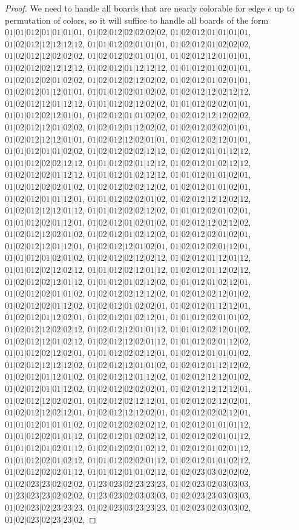 \documentclass[12pt]{article}
\theoremstyle{plain}
\theoremstyle{definition}
\theoremstyle{remark}
\begin{document}
\begin{proof}
	We need to handle all boards that are nearly colorable for edge $e$ up to permutation of colors, so it will suffice to handle all boards of the form $01|01|012|01|01|01|01$, $01|02|012|02|02|02|02$, $01|02|012|01|01|01|01$, $01|02|012|12|12|12|12$, $01|01|012|02|01|01|01$, $01|02|012|01|02|02|02$, $01|02|012|12|02|02|02$, $01|02|012|02|01|01|01$, $01|02|012|12|01|01|01$, $01|02|012|02|12|12|12$, $01|02|012|01|12|12|12$, $01|01|012|01|02|01|01$, $01|02|012|02|01|02|02$, $01|02|012|02|12|02|02$, $01|02|012|01|02|01|01$, $01|02|012|01|12|01|01$, $01|01|012|02|01|02|02$, $01|02|012|12|02|12|12$, $01|02|012|12|01|12|12$, $01|01|012|02|12|02|02$, $01|01|012|02|02|01|01$, $01|01|012|02|12|01|01$, $01|02|012|01|01|02|02$, $01|02|012|12|12|02|02$, $01|02|012|12|01|02|02$, $01|02|012|01|12|02|02$, $01|02|012|02|02|01|01$, $01|02|012|12|12|01|01$, $01|02|012|12|02|01|01$, $01|02|012|02|12|01|01$, $01|01|012|01|01|02|02$, $01|02|012|02|02|12|12$, $01|02|012|01|01|12|12$, $01|01|012|02|02|12|12$, $01|01|012|02|01|12|12$, $01|02|012|01|02|12|12$, $01|02|012|02|01|12|12$, $01|01|012|01|02|12|12$, $01|01|012|01|01|02|01$, $01|02|012|02|02|01|02$, $01|02|012|02|02|12|02$, $01|02|012|01|01|02|01$, $01|02|012|01|01|12|01$, $01|01|012|02|02|01|02$, $01|02|012|12|12|02|12$, $01|02|012|12|12|01|12$, $01|01|012|02|02|12|02$, $01|01|012|02|01|02|01$, $01|01|012|02|01|12|01$, $01|02|012|01|02|01|02$, $01|02|012|12|02|12|02$, $01|02|012|12|02|01|02$, $01|02|012|01|02|12|02$, $01|02|012|02|01|02|01$, $01|02|012|12|01|12|01$, $01|02|012|12|01|02|01$, $01|02|012|02|01|12|01$, $01|01|012|01|02|01|02$, $01|02|012|02|12|02|12$, $01|02|012|01|12|01|12$, $01|01|012|02|12|02|12$, $01|01|012|02|12|01|12$, $01|02|012|01|12|02|12$, $01|02|012|02|12|01|12$, $01|01|012|01|02|12|02$, $01|01|012|01|02|12|01$, $01|02|012|02|01|01|02$, $01|02|012|02|12|12|02$, $01|02|012|02|12|01|02$, $01|02|012|02|01|12|02$, $01|02|012|01|02|02|01$, $01|02|012|01|12|12|01$, $01|02|012|01|12|02|01$, $01|02|012|01|02|12|01$, $01|01|012|02|01|01|02$, $01|02|012|12|02|02|12$, $01|02|012|12|01|01|12$, $01|01|012|02|12|01|02$, $01|02|012|12|01|02|12$, $01|02|012|12|02|01|12$, $01|01|012|02|01|12|02$, $01|01|012|02|12|02|01$, $01|01|012|02|02|12|01$, $01|02|012|01|01|01|02$, $01|02|012|12|12|12|02$, $01|02|012|12|01|01|02$, $01|02|012|01|12|12|02$, $01|02|012|01|12|01|02$, $01|02|012|12|01|12|02$, $01|02|012|12|12|01|02$, $01|02|012|01|01|12|02$, $01|02|012|02|02|02|01$, $01|02|012|12|12|12|01$, $01|02|012|12|02|02|01$, $01|02|012|02|12|12|01$, $01|02|012|02|12|02|01$, $01|02|012|12|02|12|01$, $01|02|012|12|12|02|01$, $01|02|012|02|02|12|01$, $01|01|012|01|01|01|02$, $01|02|012|02|02|02|12$, $01|02|012|01|01|01|12$, $01|01|012|02|01|01|12$, $01|02|012|01|02|02|12$, $01|02|012|02|01|01|12$, $01|01|012|01|02|01|12$, $01|02|012|02|01|02|12$, $01|02|012|01|02|01|12$, $01|01|012|02|01|02|12$, $01|01|012|02|02|01|12$, $01|02|012|01|01|02|12$, $01|02|012|02|02|01|12$, $01|01|012|01|01|02|12$, $01|02|023|03|02|02|02$, $01|02|023|23|02|02|02$, $01|23|023|02|23|23|23$, $01|02|023|02|03|03|03$, $01|23|023|23|02|02|02$, $01|23|023|02|03|03|03$, $01|02|023|23|03|03|03$, $01|02|023|02|23|23|23$, $01|02|023|03|23|23|23$, $01|02|023|02|03|03|02$, $01|02|023|02|23|23|02$, 
\end{proof}
\end{document}
